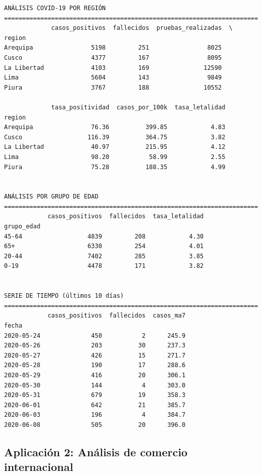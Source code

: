 \documentclass[
  doc,
  floatsintext,
  longtable,
  a4paper,
  nolmodern,
  notxfonts,
  notimes,
  12pt,
  colorlinks=true,linkcolor=blue,citecolor=blue,urlcolor=blue]{apa7}
\begin{document}
\begin{verbatim}
ANÁLISIS COVID-19 POR REGIÓN
======================================================================
             casos_positivos  fallecidos  pruebas_realizadas  \
region                                                         
Arequipa                5198         251                8025   
Cusco                   4377         167                8095   
La Libertad             4103         169               12590   
Lima                    5604         143                9849   
Piura                   3767         188               10552   

             tasa_positividad  casos_por_100k  tasa_letalidad  
region                                                         
Arequipa                76.36          399.85            4.83  
Cusco                  116.39          364.75            3.82  
La Libertad             40.97          215.95            4.12  
Lima                    98.20           58.99            2.55  
Piura                   75.28          188.35            4.99  


ANÁLISIS POR GRUPO DE EDAD
======================================================================
            casos_positivos  fallecidos  tasa_letalidad
grupo_edad                                             
45-64                  4839         208            4.30
65+                    6330         254            4.01
20-44                  7402         285            3.85
0-19                   4478         171            3.82


SERIE DE TIEMPO (últimos 10 días)
======================================================================
            casos_positivos  fallecidos  casos_ma7
fecha                                             
2020-05-24              450           2      245.9
2020-05-26              203          30      237.3
2020-05-27              426          15      271.7
2020-05-28              190          17      288.6
2020-05-29              416          20      306.1
2020-05-30              144           4      303.0
2020-05-31              679          19      358.3
2020-06-01              642          21      385.7
2020-06-03              196           4      384.7
2020-06-08              505          20      396.0
\end{verbatim}

\subsection{Aplicación 2: Análisis de comercio
internacional}\label{aplicaciuxf3n-2-anuxe1lisis-de-comercio-internacional}
\end{document}

